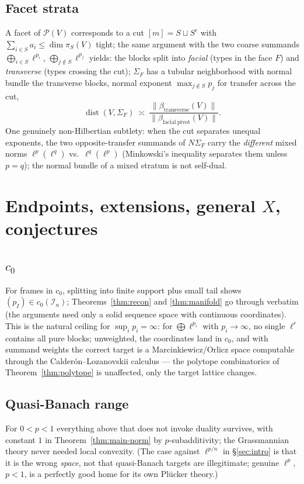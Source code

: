 \documentclass[11pt]{amsart}
\theoremstyle{definition}
\newcommand{\dist}{\operatorname{dist}}
\begin{document}
\subsection{Facet strata}

A facet of $\mathcal P(V)$ corresponds to a cut $[m]=S\sqcup S^c$ with $\sum_{i\in S}a_i\le\dim\pi_S(V)$ tight; the same argument with the two coarse summands $\bigoplus_{i\in S}\ell^{p_i}$, $\bigoplus_{j\notin S}\ell^{p_j}$ yields: the blocks split into \emph{facial} (types in the face $F$) and \emph{transverse} (types crossing the cut); $\Sigma_F$ has a tubular neighborhood with normal bundle the transverse blocks, normal exponent $\max_{j\notin S}p_j$ for transfer across the cut,
\[
\dist(V,\Sigma_F)\ \asymp\ \frac{\|\beta_{\mathrm{transverse}}(V)\|}{\|\beta_{\mathrm{facial\ pivot}}(V)\|}.
\]
One genuinely non-Hilbertian subtlety: when the cut separates unequal exponents, the two opposite-transfer summands of $N\Sigma_F$ carry the \emph{different} mixed norms $\ell^{p}(\ell^{q})$ vs.\ $\ell^{q}(\ell^{p})$ (Minkowski's inequality separates them unless $p=q$); the normal bundle of a mixed stratum is not self-dual.

\section{Endpoints, extensions, general $X$, conjectures}\label{sec:ext}

\subsection{$c_0$} For frames in $c_0$, splitting into finite support plus small tail shows $(p_I)\in c_0(\mathcal I_n)$; Theorems~\ref{thm:recon} and \ref{thm:manifold} go through verbatim (the arguments need only a solid sequence space with continuous coordinates). This is the natural ceiling for $\sup_ip_i=\infty$: for $\bigoplus\ell^{p_i}$ with $p_i\to\infty$, no single $\ell^r$ contains all pure blocks; unweighted, the coordinates land in $c_0$, and with summand weights the correct target is a Marcinkiewicz/Orlicz space computable through the Calder\'on--Lozanovskii calculus \cite{Cal,Loz} --- the polytope combinatorics of Theorem~\ref{thm:polytope} is unaffected, only the target lattice changes.

\subsection{Quasi-Banach range} For $0<p<1$ everything above that does not invoke duality survives, with constant $1$ in Theorem~\ref{thm:main-norm} by $p$-subadditivity; the Grassmannian theory never needed local convexity. (The case against $\ell^{p/n}$ in \S\ref{sec:intro} is that it is the wrong \emph{space}, not that quasi-Banach targets are illegitimate; genuine $\ell^p$, $p<1$, is a perfectly good home for its own Pl\"ucker theory.)
\end{document}
